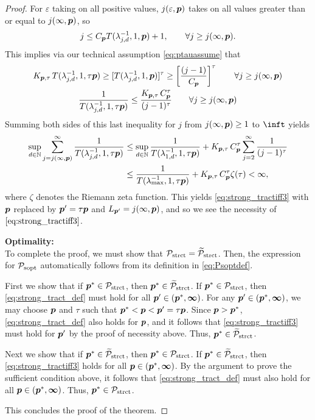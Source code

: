 \documentclass[11pt,a4paper]{article}
\newcommand{\vinfty}{\boldsymbol{\infty}}
\begin{document}
\begin{proof}
For $\varepsilon$ taking on all positive values, $j(\varepsilon,\boldsymbol{p})$ takes on all values greater than or equal to $j(\infty,\boldsymbol{p})$, so
\[
j\le C_{\boldsymbol{p}} T(\lambda_{j,d}^{-1},1,\boldsymbol{p})+1, \qquad \forall j \ge j(\infty,\boldsymbol{p}).
\]
This implies via our technical assumption \eqref{eq:ptauassume} that
\begin{gather*}
 K_{\boldsymbol{p},\tau}\,T (\lambda_{j,d}^{-1},1,\tau \boldsymbol{p}) \ge
 [T(\lambda_{j,d}^{-1},1, \boldsymbol{p})]^\tau
 \ge
  \left[\frac{(j-1)}{C_{\boldsymbol{p}}}\right]^\tau \qquad \forall j \ge j(\infty,\boldsymbol{p}) \\
 \frac{1}{T (\lambda_{j,d}^{-1},1,\tau \boldsymbol{p})} \le
\frac{K_{\boldsymbol{p},\tau}\, C_{\boldsymbol{p}}^\tau}{(j-1)^\tau}\qquad \forall j \ge j(\infty,\boldsymbol{p})
\end{gather*}
Summing both sides of this last inequality for $j$ from $j(\infty,\boldsymbol{p}) \ge 1$ to $\inft$ yields 
\begin{align*}
\sup_{d\in\mathbb{N}} \sum_{j=j (\infty,\boldsymbol{p})}^\infty \frac{1}{T (\lambda_{j,d}^{-1},1, \tau \boldsymbol{p})}
& \le  \sup_{d\in\mathbb{N}} \frac{1}{T (\lambda_{1,d}^{-1},1, \tau \boldsymbol{p})} + K_{\boldsymbol{p},\tau}\, C_{\boldsymbol{p}}^\tau
\sum_{j=2}^\infty \frac{1}{(j-1)^\tau} \\
& \le\frac{1}{T (\lambda_{\max}^{-1},1, \tau \boldsymbol{p})} +  K_{\boldsymbol{p},\tau}\, C_{\boldsymbol{p}}^\tau
\zeta (\tau)  < \infty,
\end{align*}
where $\zeta$ denotes the Riemann zeta function.
This yields \eqref{eq:strong_tractiff3} with $\boldsymbol{p}$ replaced by $\boldsymbol{p}' = \tau \boldsymbol{p}$ and $L_{\boldsymbol{p}'} = j (\infty,\boldsymbol{p})$, and so we see the necessity of $\eqref{eq:strong_tractiff3}$.

\bigskip
\noindent \textbf{Optimality:} \\
To complete the proof, we must show that $\mathcal{P}_{\textup{strct}} = \widetilde{\mathcal{P}}_{\textup{strct}}$.  Then, the expression for  $\mathcal{P}_{\textup{sopt}}$ automatically follows from its definition in \eqref{eq:Psoptdef}.

First we show  that if $\boldsymbol{p}^* \in \mathcal{P}_{\textup{strct}}$, then $\boldsymbol{p}^* \in \widetilde{\mathcal{P}}_{\textup{strct}}$.  If $\boldsymbol{p}^* \in \mathcal{P}_{\textup{strct}}$, then \eqref{eq:strong_tract_def} must hold for all $\vp' \in (\vp^*,\vinfty)$.  For any $\vp' \in (\vp^*,\vinfty)$, we may choose $\boldsymbol{p}$ and $\tau$ such that $\boldsymbol{p}^* < \boldsymbol{p} < \boldsymbol{p}' = \tau \boldsymbol{p}$. Since $\boldsymbol{p} > \boldsymbol{p}^*$, \eqref{eq:strong_tract_def} also holds for $\boldsymbol{p}$, and it follows that \eqref{eq:strong_tractiff3} must hold for $\boldsymbol{p}'$ by the proof of necessity above.  Thus, $\boldsymbol{p}^* \in \widetilde{\mathcal{P}}_{\textup{strct}}$.

Next we show that if $\boldsymbol{p}^* \in \widetilde{\mathcal{P}}_{\textup{strct}}$, then $\boldsymbol{p}^* \in \mathcal{P}_{\textup{strct}}$.  If $\boldsymbol{p}^* \in \widetilde{\mathcal{P}}_{\textup{strct}}$, then \eqref{eq:strong_tractiff3}  holds for all $\vp \in (\vp^*,\vinfty)$.  By the argument to prove the sufficient condition above, it follows that \eqref{eq:strong_tract_def} must also hold for all $\vp \in (\vp^*,\vinfty)$. Thus, $\boldsymbol{p}^* \in \mathcal{P}_{\textup{strct}}$.

\bigskip

\noindent This concludes the proof of the theorem.

\end{proof}
\end{document}
